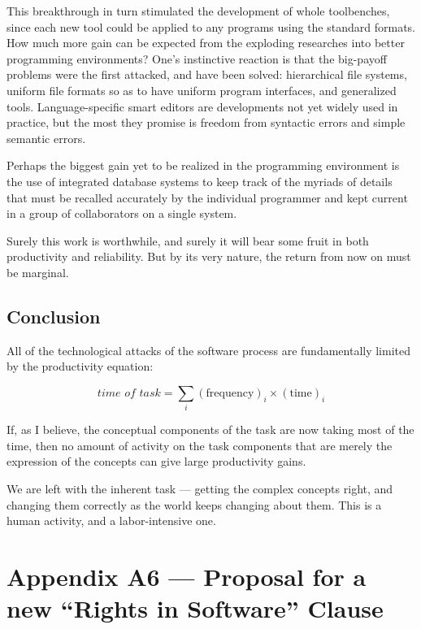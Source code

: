 \documentclass[12pt,final]{article}
\begin{document}
This breakthrough in turn stimulated the development of whole toolbenches,
since each new tool could be applied to any programs using the standard
formats. How much more gain can be expected from the exploding researches into
better programming environments?  One’s instinctive reaction is that the
big-payoff problems were the first attacked, and have been solved: hierarchical
file systems, uniform file formats so as to have uniform program interfaces,
and generalized tools. Language-specific smart editors are developments not yet
widely used in practice, but the most they promise is freedom from syntactic
errors and simple semantic errors.

Perhaps the biggest gain yet to be realized in the programming environment is
the use of integrated database systems to keep track of the myriads of details
that must be recalled accurately by the individual programmer and kept current
in a group of collaborators on a single system.

Surely this work is worthwhile, and surely it will bear some fruit in both
productivity and reliability. But by its very nature, the return from now on
must be marginal.

\subsection*{Conclusion}

All of the technological attacks of the software process are fundamentally
limited by the productivity equation:

\[\textit{time of task} = \sum_i (\textrm{frequency})_i \times (\textrm{time})_i\]

If, as I believe, the conceptual components of the task are now taking most of
the time, then no amount of activity on the task components that are merely the
expression of the concepts can give large productivity gains.

We are left with the inherent task — getting the complex concepts right, and
changing them correctly as the world keeps changing about them. This is a human
activity, and a labor-intensive one.

\newpage

\section*{Appendix A6 — Proposal for a new “Rights in Software” Clause}
\end{document}

